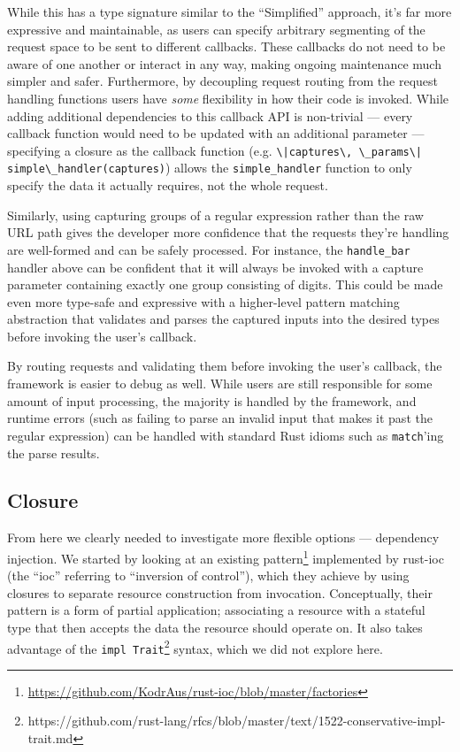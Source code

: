 \documentclass[sigconf]{acmart}
\def\code#1{\lstinline{#1}}
\begin{document}
\begin{minipage}{\linewidth}

\end{minipage}

While this has a type signature similar to the ``Simplified'' approach, it's far more expressive and maintainable, as users can specify arbitrary segmenting of the request space to be sent to different callbacks. These callbacks do not need to be aware of one another or interact in any way, making ongoing maintenance much simpler and safer. Furthermore, by decoupling request routing from the request handling functions users have \textit{some} flexibility in how their code is invoked. While adding additional dependencies to this callback API is non-trivial --- every callback function would need to be updated with an additional parameter --- specifying a closure as the callback function (e.g. \code{\|captures\, \_params\| simple\_handler(captures)}) allows the \code{simple_handler} function to only specify the data it actually requires, not the whole request.

Similarly, using capturing groups of a regular expression rather than the raw URL path gives the developer more confidence that the requests they're handling are well-formed and can be safely processed. For instance, the \code{handle_bar} handler above can be confident that it will always be invoked with a capture parameter containing exactly one group consisting of digits. This could be made even more type-safe and expressive with a higher-level pattern matching abstraction that validates and parses the captured inputs into the desired types before invoking the user's callback.

By routing requests and validating them before invoking the user's callback, the framework is easier to debug as well. While users are still responsible for some amount of input processing, the majority is handled by the framework, and runtime errors (such as failing to parse an invalid input that makes it past the regular expression) can be handled with standard Rust idioms such as \code{match}'ing the parse results.

\subsection{Closure}

From here we clearly needed to investigate more flexible options --- dependency injection. We started by looking at an existing pattern\footnote{\url{https://github.com/KodrAus/rust-ioc/blob/master/factories}} implemented by rust-ioc (the ``ioc'' referring to ``inversion of control''), which they achieve by using closures to separate resource construction from invocation. Conceptually, their pattern is a form of partial application; associating a resource with a stateful type that then accepts the data the resource should operate on. It also takes advantage of the \code{impl Trait}\footnote{https://github.com/rust-lang/rfcs/blob/master/text/1522-conservative-impl-trait.md} syntax, which we did not explore here.
\end{document}
